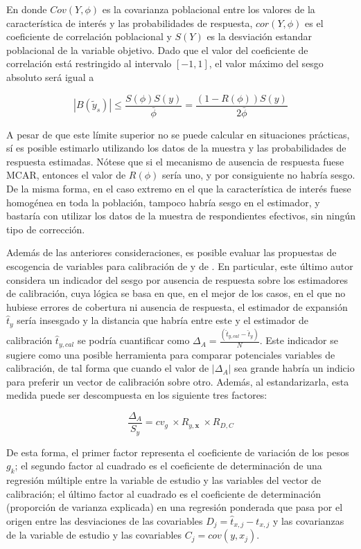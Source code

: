 \documentclass[
  12pt,
]{book}
\begin{document}
En donde \(Cov\left(Y,\phi\right)\) es la covarianza poblacional entre
los valores de la característica de interés y las probabilidades de respuesta,
\(cor\left(Y,\phi\right)\) es el coeficiente de correlación poblacional
y \(S\left(Y\right)\) es la desviación estandar poblacional de la variable objetivo. Dado que el valor del coeficiente de correlación está restringido
al intervalo \([-1, 1]\), el valor máximo del sesgo absoluto será igual a

\[
|B\left(\tilde{y}_s\right)| \leq 
\frac{S\left(\phi\right)S\left(y\right)}{\bar{\phi}}
= \frac{\left(1-R\left(\phi\right)\right)S\left(y\right)}{2\bar{\phi}}
\]

A pesar de que este límite superior no se puede calcular en situaciones prácticas, sí es posible estimarlo utilizando los datos de la muestra y las probabilidades
de respuesta estimadas. Nótese que si el mecanismo de ausencia de respuesta fuese MCAR, entonces el valor de \(R\left(\phi\right)\) sería uno, y por consiguiente no habría sesgo. De la misma forma, en el caso extremo en el que la característica de interés fuese homogénea en toda la población, tampoco habría sesgo en el estimador, y bastaría con utilizar los datos de la muestra de respondientes efectivos, sin ningún tipo de corrección.

Además de las anteriores consideraciones, es posible evaluar las propuestas de escogencia de variables para calibración de \citet{KaltonFloresCervantes_2003} y de \citet{Sarndal_2011}. En particular, este último autor considera un indicador del sesgo por ausencia de respuesta sobre los estimadores de calibración, cuya lógica se basa en que, en el mejor de los casos, en el que no hubiese errores de cobertura ni ausencia de respuesta, el estimador de expansión \(\hat{t}_{y}\) sería insesgado y la distancia que habría entre este y el estimador de calibración \(\hat{t}_{y,cal}\) se podría cuantificar como \(\Delta_A = \frac{(\hat{t}_{y,cal} - \hat{t}_{y})}{N}\). Este indicador se sugiere como una posible herramienta para comparar potenciales variables de calibración, de tal forma que cuando el valor de \(|\Delta_A|\) sea grande habría un indicio para preferir un vector de calibración sobre otro. Además, al estandarizarla, esta medida puede ser descompuesta en los siguiente tres factores:

\[\frac{\Delta_A}{S_y} = cv_g \ \times R_{y,\mathbf{x}} \ \times R_{D,C}\]

De esta forma, el primer factor representa el coeficiente de variación de los pesos \(g_k\); el segundo factor al cuadrado es el coeficiente de determinación de una regresión múltiple entre la variable de estudio y las variables del vector de calibración; el último factor al cuadrado es el coeficiente de determinación (proporción de varianza explicada) en una regresión ponderada que pasa por el origen entre las desviaciones de las covariables \(D_j = \hat{t}_{x, j} - t_{x,j}\) y las covarianzas de la variable de estudio y las covariables \(C_j = cov(y, x_j)\).
\end{document}
